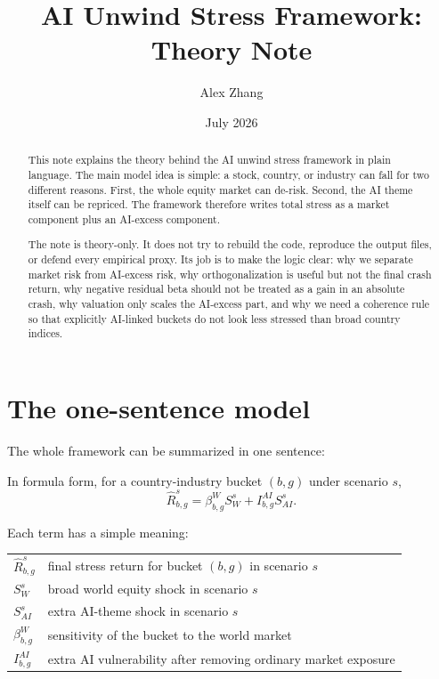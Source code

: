 \documentclass[10pt]{article}
\title{AI Unwind Stress Framework: Theory Note}
\author{Alex Zhang}
\date{July 2026}
\begin{document}
\maketitle

\begin{abstract}
This note explains the theory behind the AI unwind stress framework in plain language. The main model idea is simple: a stock, country, or industry can fall for two different reasons. First, the whole equity market can de-risk. Second, the AI theme itself can be repriced. The framework therefore writes total stress as a market component plus an AI-excess component.

The note is theory-only. It does not try to rebuild the code, reproduce the output files, or defend every empirical proxy. Its job is to make the logic clear: why we separate market risk from AI-excess risk, why orthogonalization is useful but not the final crash return, why negative residual beta should not be treated as a gain in an absolute crash, why valuation only scales the AI-excess part, and why we need a coherence rule so that explicitly AI-linked buckets do not look less stressed than broad country indices.
\end{abstract}

\tableofcontents
\newpage

\section{The one-sentence model}

The whole framework can be summarized in one sentence:

\begin{center}
\end{center}

In formula form, for a country-industry bucket $(b,g)$ under scenario $s$,
\[
\widehat R_{b,g}^{s}=\beta_{b,g}^{W}S_W^s+I_{b,g}^{AI}S_{AI}^s.
\]

Each term has a simple meaning:

\begin{center}
\begin{tabular}{ll}
$\widehat R_{b,g}^{s}$ & final stress return for bucket $(b,g)$ in scenario $s$ \\
$S_W^s$ & broad world equity shock in scenario $s$ \\
$S_{AI}^s$ & extra AI-theme shock in scenario $s$ \\
$\beta_{b,g}^{W}$ & sensitivity of the bucket to the world market \\
$I_{b,g}^{AI}$ & extra AI vulnerability after removing ordinary market exposure
\end{tabular}
\end{center}
\end{document}
